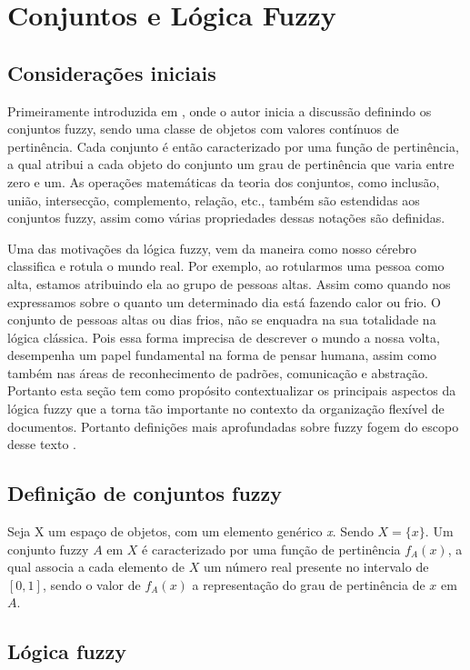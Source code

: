 \section{Conjuntos e Lógica Fuzzy}
\subsection{Considerações iniciais}
Primeiramente introduzida em \cite{Zadeh1965}, onde o autor inicia a discussão definindo os
conjuntos fuzzy, sendo uma classe de objetos com valores contínuos de pertinência. Cada conjunto é
então caracterizado por uma função de pertinência, a qual atribui a cada objeto do conjunto um grau
de pertinência que varia entre zero e um. As operações matemáticas da teoria dos conjuntos, como
inclusão, união, intersecção, complemento, relação, etc., também são estendidas aos conjuntos fuzzy,
assim como várias propriedades dessas notações são definidas.

Uma das motivações da lógica fuzzy, vem da maneira como nosso cérebro classifica e rotula o mundo
real. Por exemplo, ao rotularmos uma pessoa como alta, estamos atribuindo ela ao grupo de pessoas
altas. Assim como quando nos expressamos sobre o quanto um determinado dia está fazendo calor ou
frio. O conjunto de pessoas altas ou dias frios, não se enquadra na sua totalidade na lógica
clássica. Pois essa forma imprecisa de descrever o mundo a nossa volta, desempenha um papel
fundamental na forma de pensar humana, assim como também nas áreas de reconhecimento de padrões,
comunicação e abstração\cite{Zadeh1965}.  Portanto esta seção tem como propósito contextualizar os
principais aspectos da lógica fuzzy que a torna tão importante no contexto da organização flexível
de documentos. Portanto definições mais aprofundadas sobre fuzzy fogem do escopo desse texto .

\subsection{Definição de conjuntos fuzzy}

Seja X um espaço de objetos, com um elemento genérico {\it x\/}.  Sendo $X= \big\{x\big\}$.
Um conjunto fuzzy $A$ em $X$ é caracterizado por uma função de pertinência $f_A(x)$, a qual associa
a cada elemento de $X$ um número real presente no intervalo de $[0,1]$, sendo o valor de $f_A(x)$ a
representação do grau de pertinência de $x$ em $A$.

\subsection{Lógica fuzzy}

